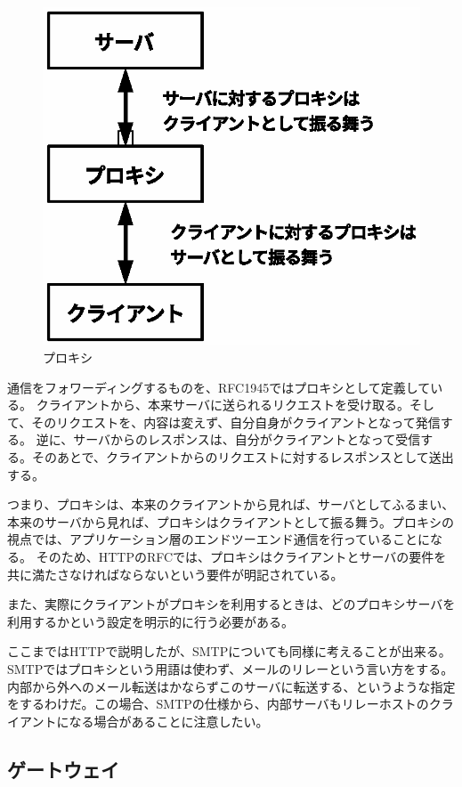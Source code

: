 \begin{figure}[htbp]
	\includegraphics[width=12cm,clip]{draw/fig3.eps}
	\caption{プロキシ}
	\label{fig:proxy}
\end{figure}

通信をフォワーディングするものを、RFC1945ではプロキシとして定義している。
クライアントから、本来サーバに送られるリクエストを受け取る。そして、そのリクエストを、内容は変えず、自分自身がクライアントとなって発信する。
逆に、サーバからのレスポンスは、自分がクライアントとなって受信する。そのあとで、クライアントからのリクエストに対するレスポンスとして送出する。

つまり、プロキシは、本来のクライアントから見れば、サーバとしてふるまい、本来のサーバから見れば、プロキシはクライアントとして振る舞う。プロキシの視点では、アプリケーション層のエンドツーエンド通信を行っていることになる。
そのため、HTTPのRFCでは、プロキシはクライアントとサーバの要件を共に満たさなければならないという要件が明記されている。

また、実際にクライアントがプロキシを利用するときは、どのプロキシサーバを利用するかという設定を明示的に行う必要がある。

ここまではHTTPで説明したが、SMTPについても同様に考えることが出来る。SMTPではプロキシという用語は使わず、メールのリレーという言い方をする。
内部から外へのメール転送はかならずこのサーバに転送する、というような指定をするわけだ。この場合、SMTPの仕様から、内部サーバもリレーホストのクライアントになる場合があることに注意したい。

\subsection{ゲートウェイ}

